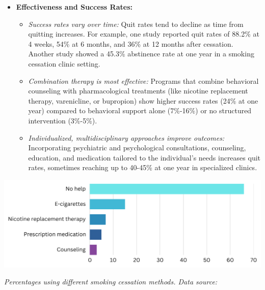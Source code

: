 \begin{itemize}
    \item \textbf{Effectiveness and Success Rates:}
        \begin{itemize}
            \item \textit{Success rates vary over time:} Quit rates tend to decline as time from 
            quitting increases. For example, one study reported quit rates of 88.2\% at 4 weeks, 
            54\% at 6 months, and 36\% at 12 months after cessation. \cite{37297676} Another study 
            showed a 45.3\% abstinence rate at one year in a smoking cessation clinic setting. 
            \cite{Esen2020}

            \item \textit{Combination therapy is most effective:} Programs that combine behavioral 
            counseling with pharmacological treatments (like nicotine replacement therapy, 
            varenicline, or bupropion) show higher success rates (24\% at one year) compared to 
            behavioral support alone (7\%-16\%) or no structured intervention (3\%-5\%). 
            \cite{cureus2024}

            \item \textit{Individualized, multidisciplinary approaches improve outcomes:} 
            Incorporating psychiatric and psychological consultations, counseling, education, and 
            medication tailored to the individual’s needs increases quit rates, sometimes reaching 
            up to 40-45\% at one year in specialized clinics. \cite{37297676}
        \end{itemize}
\end{itemize}

\vspace{1em}
\begin{center}
    \includegraphics[width=\textwidth]{../assets/06-prevention/smoking-cessation.png}

    \small\textit{Percentages using different smoking cessation methods. Data source: 
    \cite{who2018}}
\end{center}
\vspace{1em}

